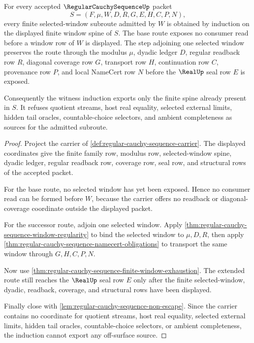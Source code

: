 \begin{theorem}
\label{thm:regular-cauchy-sequence-finite-window-witness-induction}
For every accepted $\RegularCauchySequenceUp$ packet
$$
S=(F,\mu,W,D,R,G,E,H,C,P,N),
$$
every finite selected-window subroute admitted by $W$ is obtained by induction on the displayed finite window spine of $S$. The base route exposes no consumer read before a window row of $W$ is displayed. The step adjoining one selected window preserves the route through the modulus $\mu$, dyadic ledger $D$, regular readback row $R$, diagonal coverage row $G$, transport row $H$, continuation row $C$, provenance row $P$, and local NameCert row $N$ before the $\RealUp$ seal row $E$ is exposed.

Consequently the witness induction exports only the finite spine already present in $S$. It refuses quotient streams, host real equality, selected external limits, hidden tail oracles, countable-choice selectors, and ambient completeness as sources for the admitted subroute.
\end{theorem}
\begin{proof}
Project the carrier of \autoref{def:regular-cauchy-sequence-carrier}. The displayed coordinates give the finite family row, modulus row, selected-window spine, dyadic ledger, regular readback row, coverage row, seal row, and structural rows of the accepted packet.

For the base route, no selected window has yet been exposed. Hence no consumer read can be formed before $W$, because the carrier offers no readback or diagonal-coverage coordinate outside the displayed packet.

For the successor route, adjoin one selected window. Apply \autoref{thm:regular-cauchy-sequence-window-regularity} to bind the selected window to $\mu,D,R$, then apply \autoref{thm:regular-cauchy-sequence-namecert-obligations} to transport the same window through $G,H,C,P,N$.

Now use \autoref{thm:regular-cauchy-sequence-finite-window-exhaustion}. The extended route still reaches the $\RealUp$ seal row $E$ only after the finite selected-window, dyadic, readback, coverage, and structural rows have been displayed.

Finally close with \autoref{lem:regular-cauchy-sequence-non-escape}. Since the carrier contains no coordinate for quotient streams, host real equality, selected external limits, hidden tail oracles, countable-choice selectors, or ambient completeness, the induction cannot export any off-surface source.
\end{proof}

